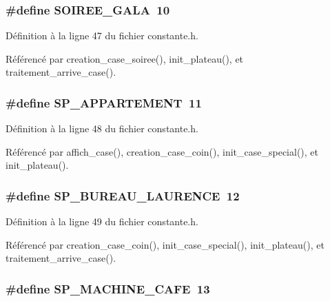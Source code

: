 \subsubsection{\setlength{\rightskip}{0pt plus 5cm}\#define SOIREE\_\-GALA~10}\label{constante_8h_4d7b4db634fc7099a86ebb0ce4fcfaf6}




D\'{e}finition \`{a} la ligne 47 du fichier constante.h.

R\'{e}f\'{e}renc\'{e} par creation\_\-case\_\-soiree(), init\_\-plateau(), et traitement\_\-arrive\_\-case().
\subsubsection{\setlength{\rightskip}{0pt plus 5cm}\#define SP\_\-APPARTEMENT~11}\label{constante_8h_a412b74a21af80417ecf2876733377e9}




D\'{e}finition \`{a} la ligne 48 du fichier constante.h.

R\'{e}f\'{e}renc\'{e} par affich\_\-case(), creation\_\-case\_\-coin(), init\_\-case\_\-special(), et init\_\-plateau().
\subsubsection{\setlength{\rightskip}{0pt plus 5cm}\#define SP\_\-BUREAU\_\-LAURENCE~12}\label{constante_8h_37d0262bca8759aebef506663da32f4f}




D\'{e}finition \`{a} la ligne 49 du fichier constante.h.

R\'{e}f\'{e}renc\'{e} par creation\_\-case\_\-coin(), init\_\-case\_\-special(), init\_\-plateau(), et traitement\_\-arrive\_\-case().
\subsubsection{\setlength{\rightskip}{0pt plus 5cm}\#define SP\_\-MACHINE\_\-CAFE~13}\label{constante_8h_73652011835007bc4ec45884fc94cc28}




